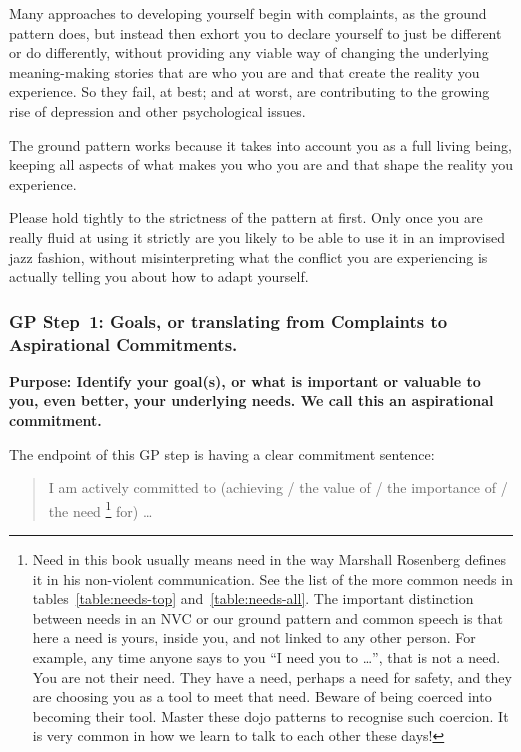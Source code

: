 Many approaches to developing yourself begin with complaints, as the ground pattern does, but instead then exhort you to declare yourself to just be different or do differently, without providing any viable way of changing the underlying meaning-making stories that are who you are and that create the reality you experience. So they fail, at best; and at worst, are contributing to the growing rise of depression and other psychological issues\cite{wilson-redirect}. 


The ground pattern works because it takes into account you as a full living being, keeping all aspects of what makes you who you are and that shape the reality you experience.


Please hold tightly to the strictness of the pattern at first. Only once you are really fluid at using it strictly are you likely to be able to use it in an improvised jazz fashion, without misinterpreting what the conflict you are experiencing is actually telling you about how to adapt yourself.


\subsubsection[GP Step~1: From Complaints to Aspirational Commitments] {GP Step~1: Goals, 
or translating from Complaints to Aspirational Commitments.}
\textbf{Purpose: Identify your goal(s), or what is important or valuable to you, even better, your underlying needs. We call this an aspirational commitment.} ~


The endpoint of this GP step is having a clear commitment sentence:


\begin{quote}
I am actively committed to (achieving / the value of / the importance of / the need
\footnote{Need in this book usually means need in the way Marshall Rosenberg defines it in his non-violent communication. See the list of the more common needs in tables~\ref{table:needs-top} and~\ref{table:needs-all}. The important distinction between needs in an NVC or our ground pattern and common speech is that here a need is yours, inside you, and not linked to any other person. For example, any time anyone says to you “I need you to …”, that is not a need. You are not their need. They have a need, perhaps a need for safety, and they are choosing you as a tool to meet that need. Beware of being coerced into becoming their tool. Master these dojo patterns to recognise such coercion. It is very common in how we learn to talk to each other these days!} 
for) \ldots
\end{quote}


